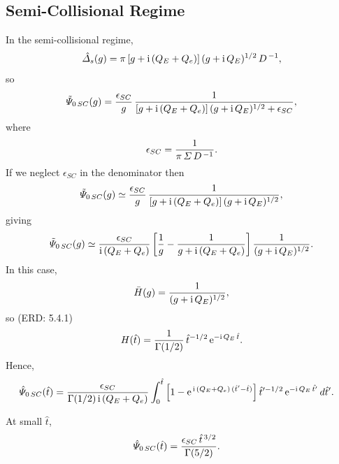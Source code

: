 \documentclass[titlepage=false,12pt]{article}
\begin{document}
\subsection{Semi-Collisional Regime}
In the semi-collisional regime, 
\begin{equation}
\hat{\mit\Delta}_s(g) = \pi\,[g+ {\rm i}\,(Q_E+Q_e)]\,(g+{\rm i} \,Q_E)^{1/2}\,D^{\,-1},
\end{equation}
so 
\begin{equation}
\tilde{\mit\Psi}_{0\,SC}(g) =\frac{\epsilon_{SC}}{g}\,\frac{1}{[g+ {\rm i}\,(Q_E+Q_e)]\,(g+{\rm i} \,Q_E)^{1/2}
+\epsilon_{SC}},
\end{equation}
where
\begin{equation}
\epsilon_{SC}= \frac{1}{\pi\,{\mit\Sigma}\,D^{\,-1}}.
\end{equation}
If we neglect $\epsilon_{SC}$ in the denominator then
\begin{equation} 
\tilde{\mit\Psi}_{0\,SC}(g) \simeq \frac{\epsilon_{SC}}{g}\,\frac{1}{[g+ {\rm i}\,(Q_E+Q_e)]\,(g+{\rm i} \,Q_E)^{1/2}},
\end{equation}
giving
\begin{equation}
\tilde{\mit\Psi}_{0\,SC}(g) \simeq \frac{\epsilon_{SC}}{{\rm i}\,(Q_E+Q_e)}
\left[\frac{1}{g}- \frac{1}{g+ {\rm i}\,(Q_E+Q_e)}\right]\frac{1}{(g+{\rm i} \,Q_E)^{1/2}}.
\end{equation}
In this case, 
\begin{equation}
\bar{H}(g) = \frac{1}{(g+{\rm i}\,Q_E)^{1/2}},
\end{equation}
so (ERD: 5.4.1)
\begin{equation}
H(\hat{t}) = \frac{1}{\Gamma(1/2)}\,\hat{t}^{-1/2}\,{\rm e}^{-{\rm i}\,Q_E\,\hat{t}}.
\end{equation}
Hence,
\begin{align}
\hat{\mit\Psi}_{0\,SC}(\hat{t}) &= \frac{\epsilon_{SC}}{\Gamma(1/2)\,{\rm i}\,(Q_E+Q_e)} \int
_0^{\hat{t}}\left[1-{\rm e}^{\,{\rm i}\,(Q_E+Q_e)\,(\hat{t}'-\hat{t})}\right]
\hat{t}'^{-1/2}\,{\rm e}^{-{\rm i}\,Q_E\,\hat{t'}}\,d\hat{t}'.
\end{align}

At small $\hat{t}$, 
\begin{align}
\hat{\mit\Psi}_{0\,SC}(\hat{t}) &= \frac{\epsilon_{SC}\,\hat{t}^{\,3/2}}{\Gamma(5/2)}.
\end{align}
\end{document}
